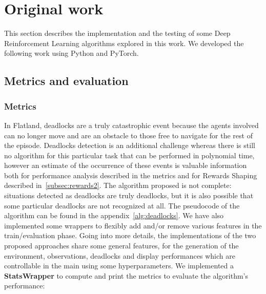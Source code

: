 \documentclass[11pt, a4paper, hidelinks]{report}
\begin{document}
\chapter{Original work}\label{ch:original-work}

This section describes the implementation and the testing of some Deep Reinforcement Learning algorithms explored in this work.
We developed the following work using Python and PyTorch.

\section{Metrics and evaluation}\label{sec:metrics-and-evaluation}

\subsection{Metrics}\label{subsec:metrics}

In Flatland, deadlocks are a truly catastrophic event because the agents involved can no longer move and are an obstacle to those free to navigate for the rest of the episode.
Deadlocks detection is an additional challenge whereas there is still no algorithm for this particular task that can be performed in polynomial time, however an estimate of the occurrence of these events is valuable information both for performance analysis described in the metrics and for Rewards Shaping described in~\ref{subsec:rewards2}.
The algorithm proposed is not complete: situations detected as deadlocks are truly deadlocks, but it is also possible that some particular deadlocks are not recognized at all.
The pseudocode of the algorithm can be found in the appendix~\ref{alg:deadlocks}. 
We have also implemented some wrappers to flexibly add and/or remove various features in the train/evaluation phase. 
Going into more details, the implementations of the two proposed approaches share some general features, for the generation of the environment, observations, deadlocks and display performances which are controllable in the main using some hyperparameters.
We implemented a \textbf{StatsWrapper} to compute and print the metrics to evaluate the algorithm's performance:
\end{document}
